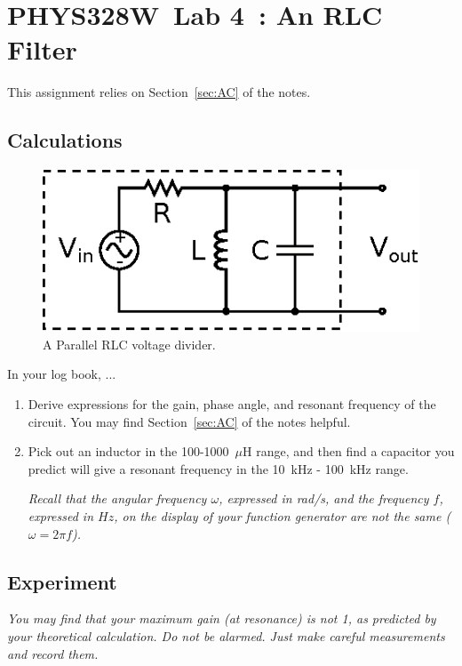 \documentclass[11pt]{article}
\newcommand{\COURSE}{PHYS328W}
\newcommand{\LABNUM}{4}
\newcommand{\TITLE}{An RLC Filter}
\begin{document}
\thispagestyle{empty}

\section*{\COURSE\ Lab \LABNUM\ : \TITLE}

This assignment relies on Section~\ref{sec:AC} of the notes.

\subsection*{Calculations}

\begin{figure}[h]
\centering
\includegraphics{rlcparallel.eps}
\caption{A Parallel RLC voltage divider.}
\label{fig:rlcparallel}
\end{figure}

In your log book, ...

\begin{enumerate}
\item Derive expressions for the gain, phase angle, and resonant
  frequency of the circuit. You may find Section~\ref{sec:AC} of the
  notes helpful.

\item Pick out an inductor in the 100-1000~$\mu$H range, and then find
  a capacitor you predict will give a resonant frequency in the 10~kHz
  - 100~kHz range.

  \emph{Recall that the angular frequency $\omega$, expressed in
    rad/s, and the frequency $f$, expressed in $Hz$, on the display of
    your function generator are not the same ($\omega = 2\pi f$).}
\end{enumerate}

\subsection*{Experiment}

\emph{You may find that your maximum gain (at resonance) is not
  1, as predicted by your theoretical calculation. Do not
  be alarmed. Just make careful measurements and record them.}
\end{document}
